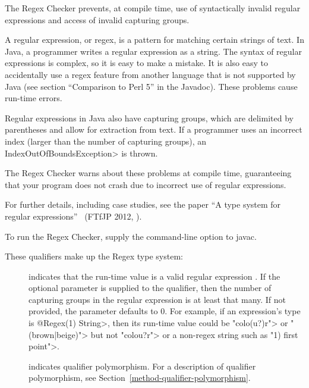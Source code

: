 
The Regex Checker prevents, at compile time, use of syntactically invalid
regular expressions and access of invalid capturing groups.

A regular expression, or regex, is a pattern for matching certain strings
of text.  In Java, a programmer writes a regular expression as a string.
The syntax of regular expressions is complex, so it is easy to make a
mistake.  It is also easy to accidentally use a regex feature from another
language that is not supported by Java (see section ``Comparison to Perl
5'' in the  Javadoc).
These problems cause run-time errors.

Regular expressions in Java also have capturing groups, which
are delimited by parentheses and allow for extraction from text.
If a programmer uses an incorrect index (larger than the number of
capturing groups), an \<IndexOutOfBoundsException> is thrown.

The Regex Checker warns about these problems at compile time, guaranteeing
that your program does not crash due to incorrect use of regular expressions.

For further details, including case studies, see the paper ``A type system
for regular expressions''~\cite{SpishakDE2012} (FTfJP 2012,
).

To run the Regex Checker, supply the
command-line option to javac.



These qualifiers make up the Regex type system:

\begin{description}

\item[]
  indicates that the run-time value is a valid regular expression
  .  If the optional parameter is supplied to the qualifier,
  then the number of capturing groups in the regular expression is at least
  that many. If not provided, the parameter defaults to 0.
  For example, if an expression's type is \<@Regex(1) String>, then its
  run-time value could be \<"colo(u?)r"> or \<"(brown|beige)"> but not
  \<"colou?r"> or a non-regex string such as \<"1) first point">.

\item[]
  indicates qualifier polymorphism.
  For a description of qualifier polymorphism, see
  Section~\ref{method-qualifier-polymorphism}.

\end{description}

